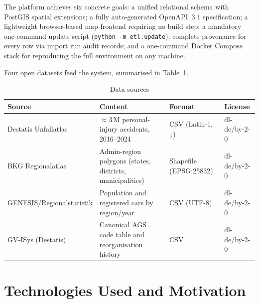 \documentclass[12pt,a4paper]{article}
\begin{document}
The platform achieves six concrete goals: a unified relational schema with PostGIS spatial extensions; a fully auto-generated OpenAPI~3.1 specification; a lightweight browser-based map frontend requiring no build step; a mandatory one-command update script (\texttt{python -m etl.update}); complete provenance for every row via import run audit records; and a one-command Docker Compose stack for reproducing the full environment on any machine.

Four open datasets feed the system, summarised in Table~\ref{tab:sources}.

\begin{table}[H]
\centering
\caption{Data sources}
\label{tab:sources}
\begin{tabularx}{\textwidth}{lXll}
\toprule
\textbf{Source} & \textbf{Content} & \textbf{Format} & \textbf{License} \\
\midrule
Destatis Unfallatlas      & $\approx$3\,M personal-injury accidents, 2016--2024 & CSV (Latin-1, \texttt{;}) & dl-de/by-2-0 \\
BKG Regionalatlas         & Admin-region polygons (states, districts, municipalities) & Shapefile (EPSG:25832) & dl-de/by-2-0 \\
GENESIS/Regionalstatistik & Population and registered cars by region/year & CSV (UTF-8) & dl-de/by-2-0 \\
GV-ISys (Destatis)        & Canonical AGS code table and reorganisation history & CSV & dl-de/by-2-0 \\
\bottomrule
\end{tabularx}
\end{table}

\section{Technologies Used and Motivation}
\end{document}
